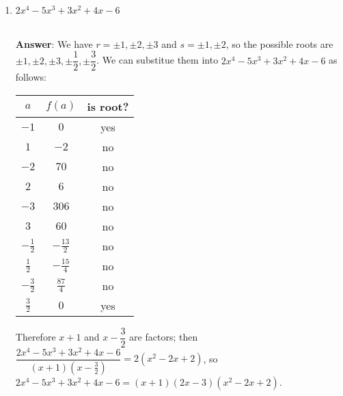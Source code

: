 \documentclass{article}
\begin{document}
\begin{enumerate}
\begin{enumerate}[start=2]
                  \item $2x^4-5x^3+3x^2+4x-6$\addtocounter{enumii}{1}\\
                        \textbf{Answer}: We have $r=\pm 1, \pm 2, \pm 3$ and $s=\pm 1, \pm 2$, so the possible roots are $\pm 1,\pm 2,\pm 3,\pm\dfrac{1}{2},\pm\dfrac{3}{2}$. We can substitue them into $2x^4-5x^3+3x^2+4x-6$ as follows:
                        \begin{center}
                              \begin{tabular}{|c|c|c|}
                                    \hline
                                    $a$            & $f(a)$          & is root? \\
                                    \hline
                                    $-1$           & $0$             & yes      \\
                                    \hline
                                    $1$            & $-2$            & no       \\
                                    \hline
                                    $-2$           & $70$            & no       \\
                                    \hline
                                    $2$            & $6$             & no       \\
                                    \hline
                                    $-3$           & $306$           & no       \\
                                    \hline
                                    $3$            & $60$            & no       \\
                                    \hline
                                    $-\frac{1}{2}$ & $-\frac{13}{2}$ & no       \\
                                    \hline
                                    $\frac{1}{2}$  & $-\frac{15}{4}$ & no       \\
                                    \hline
                                    $-\frac{3}{2}$ & $\frac{87}{4}$  & no       \\
                                    \hline
                                    $\frac{3}{2}$  & $0$             & yes      \\
                                    \hline
                              \end{tabular}
                        \end{center}
                        Therefore $x+1$ and $x-\dfrac{3}{2}$ are factors; then $\dfrac{2x^4-5x^3+3x^2+4x-6}{(x+1)(x-\frac{3}{2})}=2(x^2-2x+2)$, so $2x^4-5x^3+3x^2+4x-6=(x+1)(2x-3)(x^2-2x+2)$.

\end{enumerate}
\end{enumerate}
\end{document}
